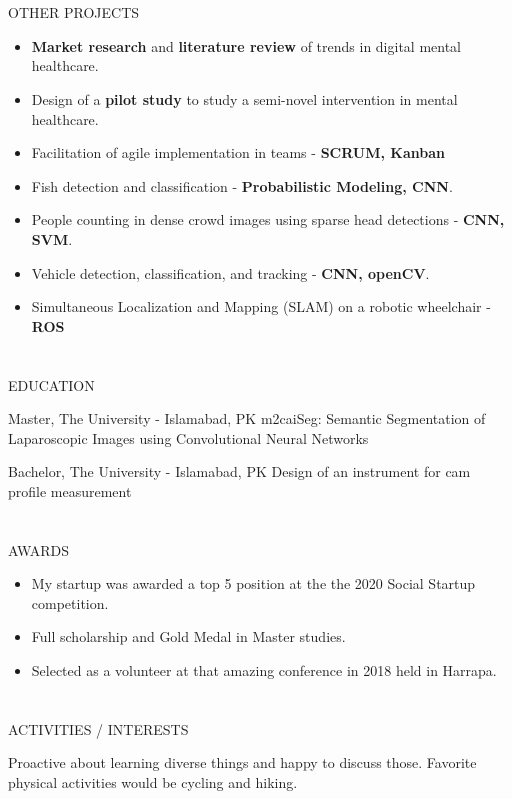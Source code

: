 \documentclass{my_cv}
\begin{document}
\begin{multicols}{2}
\section{\faPaintBrush}{OTHER PROJECTS}
\begin{itemize}[noitemsep]
    \item \textbf{Market research} and \textbf{literature review} of trends in digital mental healthcare.
    \item Design of a \textbf{pilot study} to study a semi-novel intervention in mental healthcare.
    \item Facilitation of agile implementation in teams - \textbf{SCRUM, Kanban}
    \item Fish detection and classification - \textbf{Probabilistic Modeling, CNN}.
    \item People counting in dense crowd images using sparse head detections - \textbf{CNN, SVM}.
    \item Vehicle detection, classification, and tracking - \textbf{CNN, openCV}.
    \item Simultaneous Localization and Mapping (SLAM) on a robotic wheelchair - \textbf{ROS}
\end{itemize}

\section{\faGraduationCap}{EDUCATION}
    
{Master, The University - Islamabad, PK} %
{m2caiSeg: Semantic Segmentation of Laparoscopic Images using Convolutional Neural Networks}
    
{Bachelor, The University - Islamabad, PK} %
{Design of an instrument for cam profile measurement}

\section{\faStar}{AWARDS}

\begin{itemize}[noitemsep]
    \item My startup was awarded a top 5 position at the the 2020 Social Startup competition.
    \item Full scholarship and Gold Medal in Master studies.
    \item Selected as a volunteer at that amazing conference in 2018 held in Harrapa.
\end{itemize}

\section{\faSoccerBallO}{ACTIVITIES / INTERESTS}

Proactive about learning diverse things and happy to discuss those. Favorite physical activities would be cycling and hiking.


\end{multicols}
\end{document}
